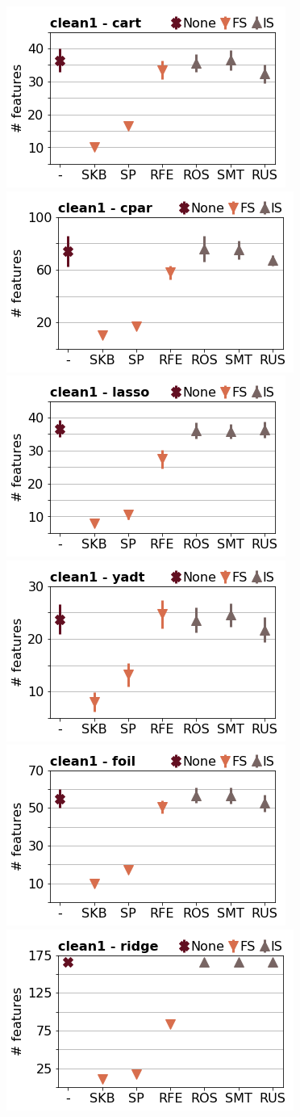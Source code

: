 \documentclass[runningheads,a4paper]{llncs}
\begin{document}
\begin{figure}[!h]
\includegraphics[width=0.32\linewidth]{fig/preps_clean1_DT_sklearn_nbr_features.png}
\includegraphics[width=0.32\linewidth]{fig/preps_clean1_RB_cpar_nbr_features.png}
\includegraphics[width=0.32\linewidth]{fig/preps_clean1_LM_lasso_nbr_features.png}
\includegraphics[width=0.32\linewidth]{fig/preps_clean1_DT_yadt_nbr_features.png}
\includegraphics[width=0.32\linewidth]{fig/preps_clean1_RB_foil_nbr_features.png}
\includegraphics[width=0.32\linewidth]{fig/preps_clean1_LM_ridge_nbr_features.png}
\end{figure}
\end{document}
